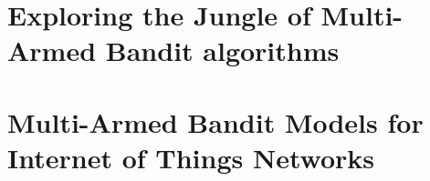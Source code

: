 \setcounter{mtc}{-1}
\adjustmtc

% 




\part{Exploring the Jungle of Multi-Armed Bandit algorithms}
\label{part:Introduction}








\part{Multi-Armed Bandit Models for Internet of Things Networks}
\label{part:MABIOT}











